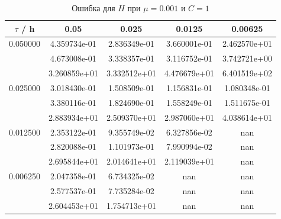 \documentclass[specialist,subf,href,colorlinks=true,12pt
,times,mtpro,specialist
]{disser}
\begin{document}
\begin{table}[H]
\small
\caption{Ошибка для $H$ при $\mu=0.001$ и $C = 1$}
\begin{center}
\begin{tabular}{|c|c|c|c|c|}
\hline
$\tau$ / h & 0.05 & 0.025 & 0.0125 & 0.00625 \\
\hline
0.050000 & 4.359734e-01  & 2.836349e-01  & 3.660001e-01  & 2.462570e+01 \\
 & 4.673008e-01  & 3.338357e-01  & 3.116752e-01  & 3.742721e+00 \\
 & 3.260859e+01  & 3.332512e+01  & 4.476679e+01  & 6.401519e+02 \\
\hline
0.025000 & 3.018430e-01  & 1.508509e-01  & 1.156831e-01  & 1.080348e-01 \\
 & 3.380116e-01  & 1.824690e-01  & 1.558249e-01  & 1.511675e-01 \\
 & 2.883934e+01  & 2.509370e+01  & 2.987060e+01  & 4.038614e+01 \\
\hline
0.012500 & 2.353122e-01  & 9.355749e-02  & 6.327856e-02  & nan \\
 & 2.820088e-01  & 1.101973e-01  & 7.990994e-02  & nan \\
 & 2.695844e+01  & 2.014641e+01  & 2.119039e+01  & nan \\
\hline
0.006250 & 2.047358e-01  & 6.734325e-02  & nan  & nan \\
 & 2.577537e-01  & 7.735284e-02  & nan  & nan \\
 & 2.604453e+01  & 1.754713e+01  & nan  & nan \\
\hline
\end{tabular}
\end{center}
\end{table}
\end{document}
